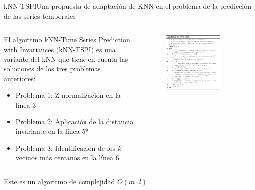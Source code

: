 \documentclass[12pt, aspectratio=169]{beamer} %
\begin{document}
\begin{frame}{kNN-TSPI}{Una propuesta de adaptación de KNN en el problema de la predicción de las series temporales}
  \begin{columns}
    \begin{column}{0.5\textwidth}
      El algoritmo kNN-Time Series Prediction with Invariances (kNN-TSPI) es una variante del kNN que tiene en cuenta las soluciones de los tres problemas anteriores:

      \begin{itemize}
      \item Problema 1: Z-normalización en la línea 3
      \item Problema 2: Aplicación de la distancia invariante en la línea 5*
      \item Problema 3: Identificación de los \textit{k} vecinos más cercanos en la línea 6
      \end{itemize}
      
    \end{column}
    \begin{column}{0.5\textwidth}
        \begin{figure}
          \includegraphics[width=0.8\textwidth]{20210313_2_algoritmo.png}
          \label{fig:algoritmo}
        \end{figure}
    \end{column}                
  \end{columns}
  Este es un algoritmo de complejidad $O(m\cdot l)$
  
\end{frame}
\end{document}
